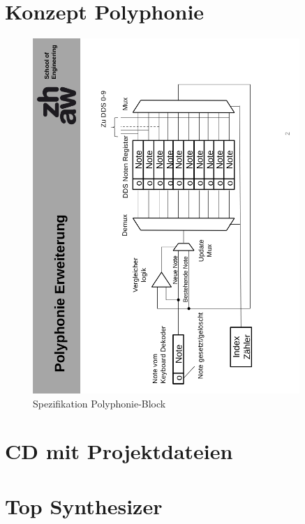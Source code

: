 \chapter{Konzept Polyphonie}\label{chap.anhang_hans_polyphonie}
\begin{figure}[H]
	\centering
	\includegraphics[width=0.9\textwidth]{images/midi_interface/Konzept_Hans_polyphonie.png}
	\caption{Spezifikation Polyphonie-Block}
	\label{fig.Hans_polyphonie}
\end{figure}



\chapter{CD mit Projektdateien}\label{sect.anhang_cd}


\chapter{Top Synthesizer}\label{chap.anhang_top_synthesizer}

